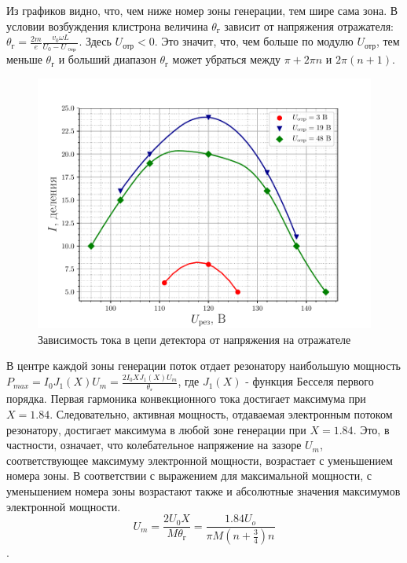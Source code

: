  Из графиков видно, что, чем ниже номер зоны генерации, тем шире сама зона. В условии возбуждения клистрона величина $\theta _ { \text{г} }$ зависит от напряжения отражателя: $\theta _ { \text{г} } = \frac { 2 m } { e } \frac { v _ { 0 } \omega L } { U _ { 0 } - U _ { \text{ oтр } } }$. Здесь $U_{\text{отр}}<0$. Это значит, что, чем больше по модулю $U_{\text{отр}}$, тем меньше $\theta _ { \text{г} }$ и больший диапазон $\theta _ { \text{г} }$ может убраться между $\pi+ 2\pi n$ и $2\pi(n+1)$.

\begin{figure}[H]
		\centering
		\includegraphics[width=\linewidth]{fig/task3b}
		\caption{Зависимость тока в цепи детектора от напряжения на отражателе}
		\label{fig:task3b}
\end{figure}


В центре каждой зоны генерации поток отдает резонатору наибольшую мощность $\displaystyle P_{max}=I_0 J_1(X) U_m=\frac{2I_0 XJ_1(X) U_m}{\theta _ { \text{г} }}$, где $J_1(X)$ - функция Бесселя первого порядка. Первая гармоника конвекционного тока достигает максимума при $X=1.84$. Следовательно, активная мощность, отдаваемая электронным потоком резонатору, достигает максимума в любой зоне генерации при $X=1.84$. Это, в частности, означает, что колебательное напряжение на зазоре $U_m$, соответствующее максимуму электронной мощности, возрастает с уменьшением номера зоны. В соответствии с выражением для максимальной мощности, с уменьшением номера зоны возрастают также и абсолютные значения максимумов электронной мощности. $$U_m=\frac{2U_0X}{M\theta _ { \text{г} }}=\frac{1.84 U_o}{\pi M(n+\frac 34)n}$$. 


